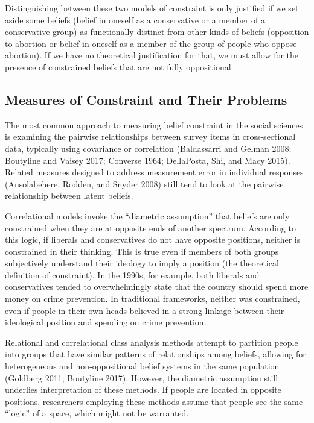 \documentclass[12pt,]{article}
\begin{document}
Distinguishing between these two models of constraint is only justified if we set aside some beliefs (belief in oneself as a conservative or a member of a conservative group) as functionally distinct from other kinds of beliefs (opposition to abortion or belief in oneself as a member of the group of people who oppose abortion). If we have no theoretical justification for that, we must allow for the presence of constrained beliefs that are not fully oppositional.

\hypertarget{measures-of-constraint-and-their-problems}{%
\subsection{Measures of Constraint and Their Problems}\label{measures-of-constraint-and-their-problems}}

The most common approach to measuring belief constraint in the social sciences is examining the pairwise relationships between survey items in cross-sectional data, typically using covariance or correlation (Baldassarri and Gelman 2008; Boutyline and Vaisey 2017; Converse 1964; DellaPosta, Shi, and Macy 2015). Related measures designed to address measurement error in individual responses (Ansolabehere, Rodden, and Snyder 2008) still tend to look at the pairwise relationship between latent beliefs.

Correlational models invoke the ``diametric assumption'' that beliefs are only constrained when they are at opposite ends of another spectrum. According to this logic, if liberals and conservatives do not have opposite positions, neither is constrained in their thinking. This is true even if members of both groups subjectively understand their ideology to imply a position (the theoretical definition of constraint). In the 1990s, for example, both liberals and conservatives tended to overwhelmingly state that the country should spend more money on crime prevention. In traditional frameworks, neither was constrained, even if people in their own heads believed in a strong linkage between their ideological position and spending on crime prevention.

Relational and correlational class analysis methods attempt to partition people into groups that have similar patterns of relationships among beliefs, allowing for heterogeneous and non-oppositional belief systems in the same population (Goldberg 2011; Boutyline 2017). However, the diametric assumption still underlies interpretation of these methods. If people are located in opposite positions, researchers employing these methods assume that people see the same ``logic'' of a space, which might not be warranted.
\end{document}

